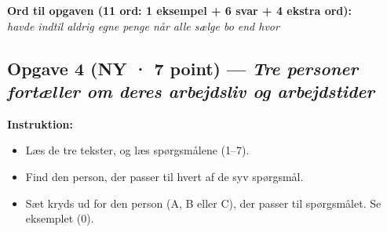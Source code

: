\begin{tcolorbox}[enhanced, colback=NCDBgBlue, colframe=NCDNavy, arc=2pt, boxrule=0.8pt, left=10pt, right=10pt, top=7pt, bottom=7pt]
\centering
\textbf{Ord til opgaven (11 ord: 1 eksempel + 6 svar + 4 ekstra ord):}\\[4pt]
\large
\textit{havde \quad indtil \quad aldrig \quad egne \quad penge \quad når \quad alle \quad sælge \quad bo \quad end \quad hvor}
\end{tcolorbox}

\clearpage
\subsection*{Opgave 4 (NY · 7 point) --- \textit{Tre personer fortæller om deres arbejdsliv og arbejdstider}}

\textbf{Instruktion:}
\begin{itemize}
  \item Læs de tre tekster, og læs spørgsmålene (1--7).
  \item Find den person, der passer til hvert af de syv spørgsmål.
  \item Sæt kryds ud for den person (A, B eller C), der passer til spørgsmålet. Se eksemplet (0).
\end{itemize}

